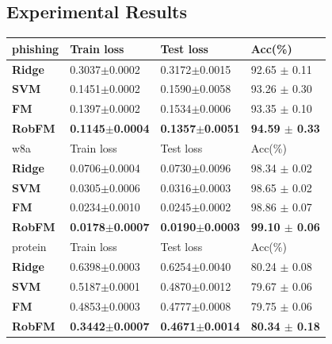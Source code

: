 \documentclass[letterpaper]{article} %
\begin{document}
\subsection{Experimental Results}
\begin{table}
	\begin{tabu} to \textwidth {|X[c]| X[c]| X[c]| X[c]|}
		\hline
		phishing           & Train loss & Test loss & Acc(\%)  \\
		\hline
		\textbf{Ridge} 	 &0.3037$\pm$0.0002  &0.3172$\pm$0.0015  &  92.65 $\pm$ 0.11   \\ \hline
		\textbf{SVM} 	 &0.1451$\pm$0.0002  &0.1590$\pm$0.0058  &  93.26 $\pm$ 0.30   \\ \hline
		\textbf{FM} 	  	&0.1397$\pm$0.0002 &0.1534$\pm$0.0006  &93.35 $\pm$ 0.10  \\ \hline
		\textbf{RobFM}   	&\textbf{0.1145$\pm$0.0004} &\textbf{0.1357$\pm$0.0051}  &\textbf{94.59 $\pm$ 0.33}   \\ \hline \hline
		w8a               & Train loss & Test loss & Acc(\%)  \\
		\hline
		\textbf{Ridge} 	 &0.0706$\pm$0.0004  &0.0730$\pm$0.0096  & 98.34 $\pm$ 0.02   \\ \hline
		\textbf{SVM} 	 &0.0305$\pm$0.0006  &0.0316$\pm$0.0003  & 98.65 $\pm$ 0.02   \\ \hline
		\textbf{FM} 	 &0.0234$\pm$0.0010  &0.0245$\pm$0.0002  & 98.86 $\pm$ 0.07  \\ \hline
		\textbf{RobFM}   &\textbf{0.0178$\pm$0.0007}  &\textbf{0.0190$\pm$0.0003}  &\textbf{99.10 $\pm$ 0.06}   \\ \hline
		\hline
		protein               & Train loss & Test loss & Acc(\%)  \\
		\hline
		\textbf{Ridge} 	 &0.6398$\pm$0.0003  &0.6254$\pm$0.0040  & 80.24 $\pm$ 0.08    \\ \hline
		\textbf{SVM} 	 &0.5187$\pm$0.0001  &0.4870$\pm$0.0012  & 79.67 $\pm$ 0.06    \\ \hline
		\textbf{FM} 	 &0.4853$\pm$0.0003  &0.4777$\pm$0.0008  & 79.75 $\pm$ 0.06    \\ \hline
		\textbf{RobFM}   &\textbf{0.3442$\pm$0.0007}  &\textbf{0.4671$\pm$0.0014}  &\textbf{80.34 $\pm$ 0.18}   \\ \hline

\end{tabu}
\end{table}
\end{document}

